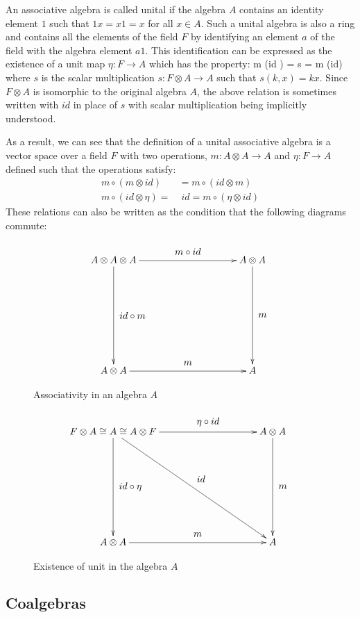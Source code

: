 An associative algebra is called unital if the algebra $A$ contains an identity element $1$ such
that $1x = x1 = x$ for all $x \in A$. Such a unital algebra is also a ring and contains all the
elements of the field $F$ by identifying an element $a$ of the field with the algebra element $a1$.
This identification can be expressed as the existence of a unit map $\eta: F \rightarrow A$ which
has the property:
\beq
m \circ (id \otimes \eta) = s = m \circ (\eta \otimes id)
\eeq
where $s$ is the scalar multiplication $s: F \otimes A \rightarrow A$ such that $s(k, x) = kx$.
Since $F \otimes A$ is isomorphic to the original algebra $A$, the above relation is sometimes
written with $id$ in place of $s$ with scalar multiplication being implicitly understood.


As a result, we can see that the definition of a unital associative algebra is a
vector space over a field $F$ with two operations, $m: A \otimes A \rightarrow A$
and $\eta: F \rightarrow A$ defined such that the operations satisfy:
\begin{align}
m\circ(m \otimes id) &= m\circ(id \otimes m) \\
m \circ (id \otimes \eta) = &\; id = m \circ (\eta \otimes id)
\end{align}
These relations can also be written as the condition that the following diagrams
commute:
\pagebreak
\begin{figure}[!h]
  \[
  \xymatrix@=100pt{
    A \otimes A \otimes A \ar[r]^-*+{m \circ id} \ar[d]^-*+{id \circ m}& A \otimes A \ar[d]^-*+{m}\\
    A \otimes A \ar[r]^-*+{m} & A \\
  }
  \]
  \caption{Associativity in an algebra $A$}
  \label{assoc-algebra}
\end{figure}
\begin{figure}[!h]
  \[
  \xymatrix@=100pt{
    F \otimes A \cong A \cong A \otimes F
       \ar[r]^-*+{\eta \circ id}
       \ar[d]^-*+{id \circ \eta}
       \ar[dr]^-*+{id} & A \otimes A \ar[d]^-*+{m}\\
    A \otimes A \ar[r]^-*+{m} & A \\
  }
  \]
  \caption{Existence of unit in the algebra $A$}
  \label{unit-algebra}
\end{figure}




\subsection{Coalgebras}


